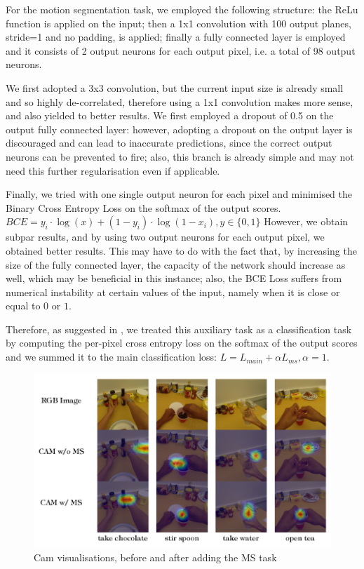 \documentclass[10pt,twocolumn,letterpaper]{article}
\begin{document}
For the motion segmentation task, we employed the following structure: the ReLu function is applied on the input; then a 1x1 convolution with 100 output planes, stride=1 and no padding, is applied; finally a fully connected layer is employed and it consists of 2 output neurons for each output pixel, i.e. a total of 98 output neurons.

We first adopted a 3x3 convolution, but the current input size is already small and so highly de-correlated, therefore using a 1x1 convolution makes more sense, and also yielded to better results. We first employed a dropout of 0.5 on the output fully connected layer: however, adopting a dropout on the output layer is discouraged and can lead to inaccurate predictions, since the correct output neurons can be prevented to fire; also, this branch is already simple and may not need this further regularisation even if applicable. 

Finally, we tried with one single output neuron for each pixel and minimised the Binary Cross Entropy Loss on the softmax of the output scores. ${BCE = y_i \cdot \log(x) + (1 - y_i) \cdot \log(1 - x_i), y \in \{0, 1\}}$ However, we obtain subpar results, and by using two output neurons for each output pixel, we obtained better results. This may have to do with the fact that, by increasing the size of the fully connected layer, the capacity of the network should increase as well, which may be beneficial in this instance; also, the BCE Loss suffers from numerical instability at certain values of the input, namely when it is close or equal to $0$ or $1$.

Therefore, as suggested in \cite{planamente2020joint}, we treated this auxiliary task as a classification task by computing the per-pixel cross entropy loss on the softmax of the output scores and we summed it to the main classification loss: ${L = L_{main} + \alpha L_{ms}, \alpha = 1}$.

\begin{figure}
	\begin{center}
		\includegraphics[width=\linewidth]{grafici/cams_img.pdf}		
	\end{center}
	\caption{Cam visualisations, before and after adding the MS task}
	\label{fig:cams}
\end{figure}
\end{document}
